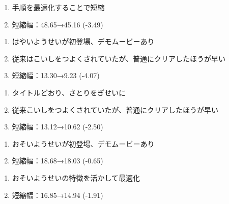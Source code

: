 \clearpage
\begin{enumerate}[label={\sarrow}]
\item 手順を最適化することで短縮
\item 短縮幅：48.65→45.16 (-3.49)
\end{enumerate}



\begin{enumerate}[label={\sarrow}]
\item はやいようせいが初登場、デモムービーあり
\item 従来はこいしをつよくされていたが、普通にクリアしたほうが早い
\item 短縮幅：13.30→9.23 (-4.07)
\end{enumerate}



\begin{enumerate}[label={\sarrow}]
\item タイトルどおり、さとりをぎせいに
\item 従来こいしをつよくされていたが、普通にクリアしたほうが早い
\item 短縮幅：13.12→10.62 (-2.50)
\end{enumerate}



\begin{enumerate}[label={\sarrow}]
\item おそいようせいが初登場、デモムービーあり
\item 短縮幅：18.68→18.03 (-0.65)
\end{enumerate}



\begin{enumerate}[label={\sarrow}]
\item おそいようせいの特徴を活かして最適化
\item 短縮幅：16.85→14.94 (-1.91)
\end{enumerate}



